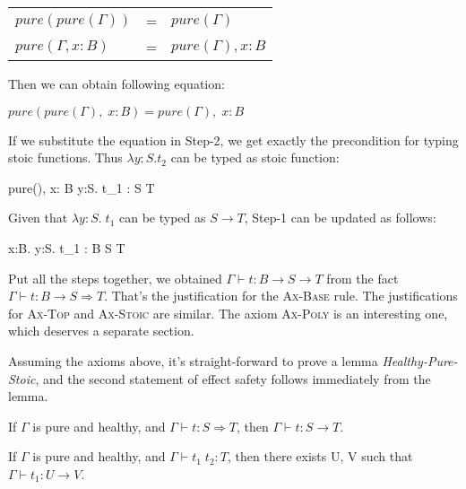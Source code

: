 \begin{center}
\begin{tabular}{l c l}
$pure(pure(\Gamma))$ & = & $pure(\Gamma)$ \\
$pure(\Gamma, x:B)$ & = & $pure(\Gamma), x:B$
\end{tabular}
\end{center}

Then we can obtain following equation:

\begin{center}
  $pure(pure(\Gamma),\; x: B) = pure(\Gamma),\; x: B$
\end{center}

If we substitute the equation in Step-2, we get exactly the
precondition for typing stoic functions. Thus $\lambda y:S.t_2$ can be
typed as stoic function:

{ pure(\Gamma),\; x: B \vdash \lambda y:S. \; t_1 : S \to T }

Given that $\lambda y:S. \; t_1$ can be typed as $S \to T$, Step-1 can
be updated as follows:

{ \Gamma \vdash \lambda x:B. \lambda y:S. \; t_1 : B \to S \to T }

Put all the steps together, we obtained
$\Gamma \vdash t : B \to S \to T$ from the fact
$\Gamma \vdash t : B \to S \Rightarrow T$. That's the justification
for the \textsc{Ax-Base} rule. The justifications for \textsc{Ax-Top}
and \textsc{Ax-Stoic} are similar. The axiom \textsc{Ax-Poly} is an
interesting one, which deserves a separate section.

Assuming the axioms above, it's straight-forward to prove a lemma
\emph{Healthy-Pure-Stoic}, and the second statement of effect safety
follows immediately from the lemma.

\begin{lemma}
  If $\Gamma$ is pure and healthy,  and $\Gamma \vdash t : S
  \Rightarrow T$, then $\Gamma \vdash t : S \to T$.
\end{lemma}

\begin{theorem}
  If $\Gamma$ is pure and healthy, and $\Gamma \vdash t_1 \; t_2 : T$,
  then there exists U, V such that $\Gamma \vdash t_1 : U \to V$.
\end{theorem}


